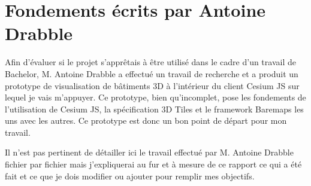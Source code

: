 \section{Fondements écrits par Antoine Drabble}

Afin d'évaluer si le projet s'apprêtais à être utilisé dans le cadre d'un travail de Bachelor, M. Antoine Drabble a effectué un travail de recherche et a produit un prototype de visualisation de bâtiments 3D à l'intérieur du client Cesium JS sur lequel je vais m'appuyer. Ce prototype, bien qu'incomplet, pose les fondements de l'utilisation de Cesium JS, la spécification 3D Tiles et le framework Baremaps les uns avec les autres. Ce prototype est donc un bon point de départ pour mon travail.

Il n'est pas pertinent de détailler ici le travail effectué par M. Antoine Drabble fichier par fichier mais j'expliquerai au fur et à mesure de ce rapport ce qui a été fait et ce que je dois modifier ou ajouter pour remplir mes objectifs.